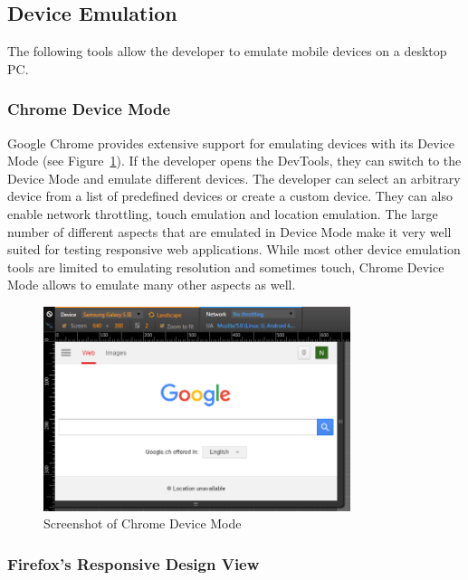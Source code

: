 \subsection{Device Emulation}

The following tools allow the developer to emulate mobile devices on a desktop PC. 

\subsubsection{Chrome Device Mode}

Google Chrome provides extensive support for emulating devices with its Device Mode (see Figure~\ref{fig:device_mode}). If the developer opens the DevTools, they can switch to the Device Mode and emulate different devices. The developer can select an arbitrary device from a list of predefined devices or create a custom device. They can also enable network throttling, touch emulation and location emulation. The large number of different aspects that are emulated in Device Mode make it very well suited  for testing responsive web applications. While most other device emulation tools are limited to emulating resolution and sometimes touch, Chrome Device Mode allows to emulate many other aspects as well.

\begin{figure}[H]
  \centering
    \includegraphics[width=0.8\textwidth]{images/relatedwork/device_mode_2.png}
	\caption[Screenshot: Chrome Device Mode]{Screenshot of Chrome Device Mode}
	\label{fig:device_mode}
\end{figure}

\subsubsection{Firefox's Responsive Design View}

